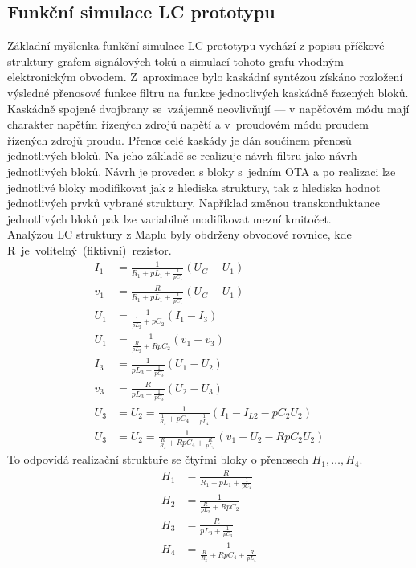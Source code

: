 \subsection{Funkční simulace LC prototypu}\label{s:KASK2}
\noindent Základní myšlenka funkční simulace LC prototypu vychází z popisu příčkové struktury grafem signálových toků a simulací tohoto grafu vhodným elektronickým obvodem. Z~aproximace bylo kaskádní syntézou získáno rozložení výsledné přenosové funkce filtru na funkce jednotlivých kaskádně řazených bloků. Kaskádně spojené dvojbrany se~vzájemně neovlivňují --- v napěťovém módu mají charakter napětím řízených zdrojů napětí a v~proudovém módu proudem řízených zdrojů proudu. Přenos celé kaskády je dán součinem přenosů jednotlivých bloků. Na jeho základě se realizuje návrh filtru jako návrh jednotlivých bloků. Návrh je proveden s bloky s~jedním OTA a po realizaci lze jednotlivé bloky modifikovat jak z hlediska struktury, tak z hlediska hodnot jednotlivých prvků vybrané struktury. Například změnou transkonduktance jednotlivých bloků pak lze variabilně modifikovat mezní kmitočet.\\
\newpage
\noindent Analýzou LC struktury z Maplu byly obdrženy obvodové rovnice, kde R~je~volitelný~(fiktivní)~rezistor.
\begin{align}
I_1 &= \frac{1}{R_1 + pL_1 + \frac{1}{pC_1}}(U_G - U_1)\\
v_1 & = \frac{R}{R_1 + pL_1 + \frac{1}{pC_1}}(U_G - U_1)\\
U_1 &= \frac{1}{\frac{1}{pL_2} + pC_2}(I_1 - I_{3})\\
U_1 &= \frac{1}{\frac{R}{pL_2} + RpC_2}(v_1 - v_{3})\\
I_{3} &= \frac{1}{pL_3 + \frac{1}{pC_3}}(U_1 - U_2)\\
v_{3} &= \frac{R}{pL_3 + \frac{1}{pC_3}}(U_2 - U_3)\\
U_3 &= U_2 = \frac{1}{\frac{1}{R_z}+pC_4 + \frac{1}{pL_4}}(I_1 - I_{L2} - pC_2U_2)\\
U_3 &= U_2 = \frac{1}{\frac{R}{R_z}+RpC_4 + \frac{R}{pL_4}}(v_1 - U_2 - RpC_2 U_2)
\end{align}
\noindent To odpovídá realizační struktuře se čtyřmi bloky o přenosech $H_1, \ldots,H_4$.
\begin{align}
H_1 & = \frac{R}{R_1 + pL_1 + \frac{1}{pC_1}}\\
H_2 &= \frac{1}{\frac{R}{pL_2} + RpC_2}\\
H_3 &= \frac{R}{pL_3 + \frac{1}{pC_3}}\\
H_4 &= \frac{1}{\frac{R}{R_z}+RpC_4 + \frac{R}{pL_4}}
\end{align}
